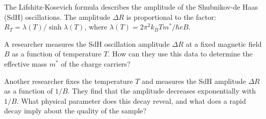 \begin{problem}
  The Lifshitz-Kosevich formula describes the amplitude of the Shubnikov-de Haas
  (SdH) oscillations. The amplitude $\Delta R$ is proportional to the factor:
  $R_T = \lambda(T)/\sinh \lambda(T)$,
  where $\lambda(T) = 2\pi^2 k_BTm^*/\hbar eB$.
  \begin{enumext}
    \item A researcher measures the SdH oscillation amplitude $\Delta R$ at a
    fixed magnetic field $B$ as a function of temperature $T$. How can they use
    this data to determine the effective mass $m^*$ of the charge carriers?
    \item Another researcher fixes the temperature $T$ and measures the SdH
    amplitude $\Delta R$ as a function of $1/B$. They find that the amplitude
    decreases exponentially with $1/B$. What physical parameter does this decay
    reveal, and what does a rapid decay imply about the quality of the sample?
  \end{enumext}
\end{problem}
